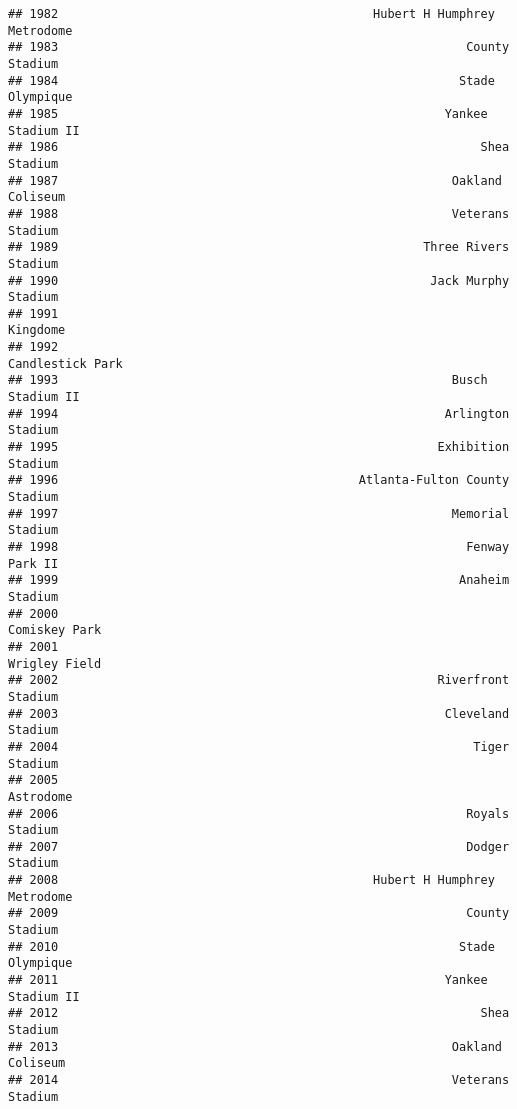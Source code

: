 \documentclass[]{article}
\begin{document}
\begin{verbatim}
## 1982                                            Hubert H Humphrey Metrodome
## 1983                                                         County Stadium
## 1984                                                        Stade Olympique
## 1985                                                      Yankee Stadium II
## 1986                                                           Shea Stadium
## 1987                                                       Oakland Coliseum
## 1988                                                       Veterans Stadium
## 1989                                                   Three Rivers Stadium
## 1990                                                    Jack Murphy Stadium
## 1991                                                               Kingdome
## 1992                                                       Candlestick Park
## 1993                                                       Busch Stadium II
## 1994                                                      Arlington Stadium
## 1995                                                     Exhibition Stadium
## 1996                                          Atlanta-Fulton County Stadium
## 1997                                                       Memorial Stadium
## 1998                                                         Fenway Park II
## 1999                                                        Anaheim Stadium
## 2000                                                          Comiskey Park
## 2001                                                          Wrigley Field
## 2002                                                     Riverfront Stadium
## 2003                                                      Cleveland Stadium
## 2004                                                          Tiger Stadium
## 2005                                                              Astrodome
## 2006                                                         Royals Stadium
## 2007                                                         Dodger Stadium
## 2008                                            Hubert H Humphrey Metrodome
## 2009                                                         County Stadium
## 2010                                                        Stade Olympique
## 2011                                                      Yankee Stadium II
## 2012                                                           Shea Stadium
## 2013                                                       Oakland Coliseum
## 2014                                                       Veterans Stadium

\end{verbatim}
\end{document}

